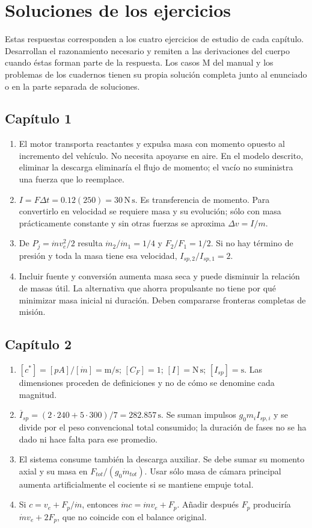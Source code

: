 \chapter{Soluciones de los ejercicios}\label{app:answers}
Estas respuestas corresponden a los cuatro ejercicios de estudio de cada capítulo. Desarrollan el razonamiento necesario y remiten a las derivaciones del cuerpo cuando éstas forman parte de la respuesta. Los casos M del manual y los problemas de los cuadernos tienen su propia solución completa junto al enunciado o en la parte separada de soluciones.
\section*{Capítulo 1}
\begin{enumerate}
\item El motor transporta reactantes y expulsa masa con momento opuesto al incremento del vehículo. No necesita apoyarse en aire. En el modelo descrito, eliminar la descarga eliminaría el flujo de momento; el vacío no suministra una fuerza que lo reemplace.
\item $I=F\Delta t=0.12(250)=30\,\mathrm{N\,s}$. Es transferencia de momento. Para convertirlo en velocidad se requiere masa y su evolución; sólo con masa prácticamente constante y sin otras fuerzas se aproxima $\Delta v=I/m$.
\item De $P_j=\dot mv_e^2/2$ resulta $\dot m_2/\dot m_1=1/4$ y $F_2/F_1=1/2$. Si no hay término de presión y toda la masa tiene esa velocidad, $I_{sp,2}/I_{sp,1}=2$.
\item Incluir fuente y conversión aumenta masa seca y puede disminuir la relación de masas útil. La alternativa que ahorra propulsante no tiene por qué minimizar masa inicial ni duración. Deben compararse fronteras completas de misión.
\end{enumerate}
\section*{Capítulo 2}
\begin{enumerate}
\item $[c^*]=[pA]/[\dot m]=\mathrm{m/s}$; $[C_F]=1$; $[I]=\mathrm{N\,s}$; $[I_{sp}]=\mathrm s$. Las dimensiones proceden de definiciones y no de cómo se denomine cada magnitud.
\item $\overline I_{sp}=(2\cdot240+5\cdot300)/7=282.857\,\mathrm s$. Se suman impulsos $g_0m_iI_{sp,i}$ y se divide por el peso convencional total consumido; la duración de fases no se ha dado ni hace falta para ese promedio.
\item El sistema consume también la descarga auxiliar. Se debe sumar su momento axial y su masa en $F_{tot}/(g_0\dot m_{tot})$. Usar sólo masa de cámara principal aumenta artificialmente el cociente si se mantiene empuje total.
\item Si $c=v_e+F_p/\dot m$, entonces $\dot mc=\dot mv_e+F_p$. Añadir después $F_p$ produciría $\dot mv_e+2F_p$, que no coincide con el balance original.
\end{enumerate}
